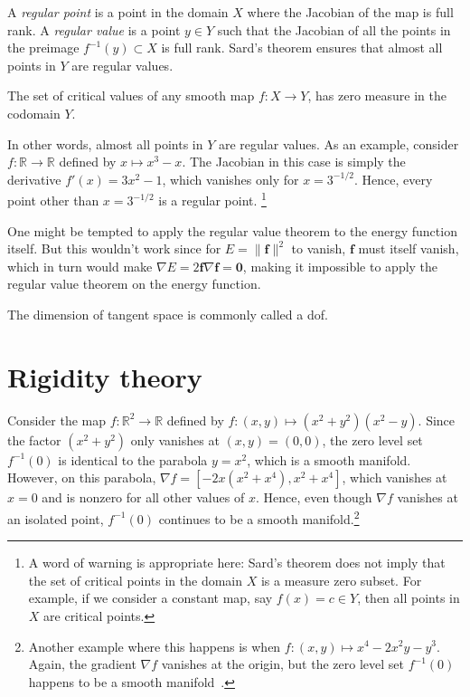 A \emph{regular point} is a point in the domain $X$ where the Jacobian of the map is full rank.
A \emph{regular value} is a point $y \in Y$ such that the Jacobian of all the points in the preimage $f^{-1}(y) \subset X$ is full rank.
Sard's theorem ensures that almost all points in $Y$ are regular values.
%
\begin{theorem}
  The set of critical values of any smooth map $f: X \to Y$, has zero measure in the codomain $Y$.
\end{theorem}

In other words, almost all points in $Y$ are regular values.
As an example, consider $f: \mathbb{R} \to \mathbb{R}$ defined by $x \mapsto x^3 - x$.
The Jacobian in this case is simply the derivative $f'(x) = 3x^2 - 1$, which vanishes only for $x = 3^{-1/2}$.
Hence, every point other than $x = 3^{-1/2}$ is a regular point.%
\footnote{A word of warning is appropriate here: Sard's theorem does not imply that the set of critical points in the domain $X$ is a measure zero subset.
For example, if we consider a constant map, say $f(x) = c \in Y$, then all points in $X$ are critical points.}

One might be tempted to apply the regular value theorem to the energy function itself.
But this wouldn't work since for $E=\|\bm{f}\|^2$ to vanish, $\bm{f}$ must itself vanish, which in turn would make $\nabla E = 2 \bm{f}\nabla\bm{f} = \bm{0}$, making it impossible to apply the regular value theorem on the energy function.

The dimension of tangent space is commonly called a \ac{dof}.

\begin{theorem}
\end{theorem}

\section{Rigidity theory}

\begin{example}
  Consider the map $f: \mathbb{R}^{2} \to \mathbb{R}$ defined by $f: (x, y) \mapsto (x^{2} + y^{2})(x^{2} - y)$.
  Since the factor $(x^{2} + y^{2})$ only vanishes at $(x, y) = (0, 0)$, the zero level set $f^{-1}(0)$ is identical to the parabola $y = x^{2}$, which is a smooth manifold.
  However, on this parabola, $\nabla f = [-2x(x^{2} + x^{4}), x^{2} + x^{4}]$, which vanishes at $x = 0$ and is nonzero for all other values of $x$.
Hence, even though $\nabla f$ vanishes at an isolated point, $f^{-1}(0)$ continues to be a smooth manifold.\footnote{Another example where this happens is when $f: (x, y) \mapsto x^{4} - 2x^{2}y - y^{3}$. Again, the gradient $\nabla f$ vanishes at the origin, but the zero level set $f^{-1}(0)$ happens to be a smooth manifold~\cite[Examples 1.1, (vi)]{diesse2020}.}
\altqed
\end{example}

